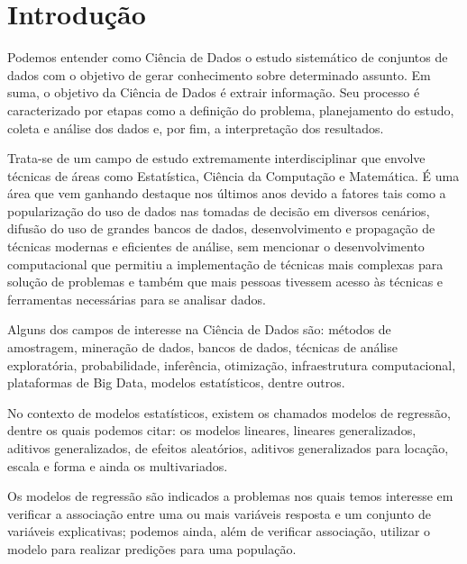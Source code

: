 \chapter{Introdução}



Podemos entender como Ciência de Dados o estudo sistemático de conjuntos de dados com o objetivo de gerar conhecimento sobre determinado assunto. Em suma, o objetivo da Ciência de Dados é extrair informação. Seu processo é caracterizado por etapas como a definição do problema, planejamento do estudo, coleta e análise dos dados e, por fim, a interpretação dos resultados.

Trata-se de um campo de estudo extremamente interdisciplinar que envolve técnicas de áreas como Estatística, Ciência da Computação e Matemática. É uma área que vem ganhando destaque nos últimos anos devido a fatores tais como a popularização do uso de dados nas tomadas de decisão em diversos cenários, difusão do uso de grandes bancos de dados, desenvolvimento e propagação de técnicas modernas e eficientes de análise, sem mencionar o desenvolvimento computacional que permitiu a implementação de técnicas mais complexas para solução de problemas e também que mais pessoas tivessem acesso às técnicas e ferramentas necessárias para se analisar dados.

Alguns dos campos de interesse na Ciência de Dados são: métodos de amostragem, mineração de dados, bancos de dados, técnicas de análise exploratória, probabilidade, inferência, otimização, infraestrutura computacional, plataformas de Big Data, modelos estatísticos, dentre outros.

No contexto de modelos estatísticos, existem os chamados modelos de regressão, dentre os quais podemos citar: os modelos lineares, lineares generalizados, aditivos generalizados, de efeitos aleatórios, aditivos generalizados para locação, escala e forma e ainda os multivariados.

Os modelos de regressão são indicados a problemas nos quais temos interesse em verificar a associação entre uma ou mais variáveis resposta e um conjunto de variáveis explicativas; podemos ainda, além de verificar associação, utilizar o modelo para realizar predições para uma população.

